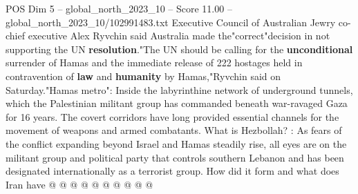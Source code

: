 \begin{textsample}{POS Dim 5 – global\_north\_2023\_10 – Score 11.00 – global\_north\_2023\_10/102991483.txt}
Executive Council of Australian Jewry co-chief executive Alex Ryvchin said Australia made the"correct"decision in not supporting the UN \textbf{resolution}."The UN should be calling for the \textbf{unconditional} surrender of Hamas and the immediate release of 222 hostages held in contravention of \textbf{law} and \textbf{humanity} by Hamas,"Ryvchin said on Saturday."Hamas metro": Inside the labyrinthine network of underground tunnels, which the Palestinian militant group has commanded beneath war-ravaged Gaza for 16 years.
The covert corridors have long provided essential channels for the movement of weapons and armed combatants.
What is Hezbollah? : As fears of the conflict expanding beyond Israel and Hamas steadily rise, all eyes are on the militant group and political party that controls southern Lebanon and has been designated internationally as a terrorist group.
How did it form and what does Iran have @ @ @ @ @ @ @ @ @ @

\end{textsample}
